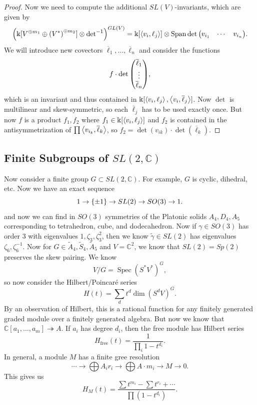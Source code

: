 \documentclass[leqno, openany]{memoir}
\theoremstyle{definition}
\theoremstyle{remark}
\theoremstyle{plain}
\theoremstyle{definition}
\theoremstyle{remark}
\newcommand{\C}{\mathbb{C}}
\renewcommand{\k}{\Bbbk}
\newcommand{\mr}[1]{\mathrm{#1}}
\newcommand{\ol}[1]{\overline{#1}}
\newcommand{\wtl}[1]{\widetilde{#1}}
\DeclareMathOperator{\Spec}{Spec}
\begin{document}
\begin{proof}
    Now we need to compute the additional $SL(V)$-invariants, which are given
    by \[ {\qty( \k[V^{\oplus m_1} \oplus {(V^*)}^{\oplus m_2}] \otimes
    {\det}^{-1} )}^{GL(V)} = \k[\ev{v_i, \ell_j}] \otimes \operatorname{Span}
\det \mqty(v_{i_1} & \cdots & v_{i_n}). \] We will introduce new covectors
$\ol{\ell}_1, \ldots, \ol{\ell}_n$ and consider the functions \[ f \cdot \det
\mqty(\ol{\ell}_1 \\ \vdots \\ \ol{\ell}_n), \] which is an invariant and thus
contained in $\k[\ev{v_i, \ell_j}, \ev{v_i, \ol{\ell}_j}]$. Now $\det$ is
multilinear and skew-symmetric, so each $\ol{\ell}_j$ has to be used exactly
once. But now $f$ is a product $f_1, f_2$ where $f_1 \in \k[\ev{v_i, \ell_j}]$
and $f_2$ is contained in the antisymmetrization of $\prod \ev{v_{i_k},
\ol{\ell}_k}$, so $f_2 = \det (v_{ik}) \cdot \det (\ol{\ell}_k)$.  \end{proof}

\subsection{Finite Subgroups of $SL(2, \C)$}%
\label{sub:finite_subgroups_of_sl_2_c_}



Now consider a finite group $G \subset SL(2, \C)$. For example, $G$ is cyclic,
dihedral, etc. Now we have an exact sequence \[ 1 \to \qty{\pm 1} \to SL(2) \to
SO(3) \to 1. \] and now we can find in $SO(3)$ symmetries of the Platonic
solids $A_4, D_4, A_5$ corresponding to tetrahedron, cube, and dodecahedron.
Now if $\gamma \in SO(3)$ has order $3$ with eigenvalues $1, \zeta_3,
\zeta_3^2$, then we know $\wtl{\gamma} \in SL(2)$ has eigenvalues $\zeta_6,
\zeta_6^{-1}$. Now for $G \in \wtl{A}_4, \wtl{S}_4, \wtl{A}_5$ and $V = \C^2$,
we know that $SL(2) = Sp(2)$ preserves the skew pairing. We know \[ V/G = \Spec
    { ( S^* V^* ) }^G, \] so now consider the Hilbert/Poincar\'e series \[ H(t)
= \sum_d t^d \dim {(S^d V)}^G. \] By an observation of Hilbert, this is a
rational function for any finitely generated graded module over a finitely
generated algebra. But now we know that $\C[a_1, \ldots, a_m]
\twoheadrightarrow A$. If $a_i$ has degree $d_i$, then the free module has
Hilbert series \[ H_{\mr{free}}(t) = \frac{1}{\prod_i 1 - t^{d_i}}. \] In
general, a module $M$ has a finite gree resolution \[ \cdots \to \bigoplus A_i
    r_i \to \bigoplus A \cdot m_i \to M \to 0. \] This gives us \[ H_M(t) =
\frac{\sum t^{m_i} - \sum t^{r_i} + \cdots}{\prod (1-t^{d_i})}. \]
\end{document}
